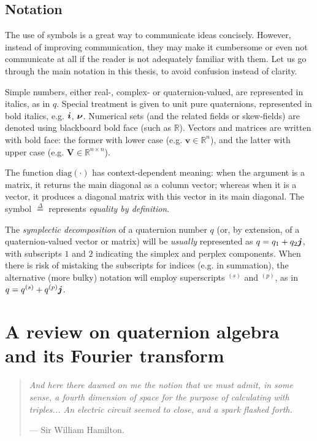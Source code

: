 \section{Notation}
The use of symbols is a great way to communicate ideas concisely. However, instead of improving communication, they may make it cumbersome or even not communicate at all if the reader is not adequately familiar with them. Let us go through the main notation in this thesis, to avoid confusion instead of clarity.

Simple numbers, either real-, complex- or quaternion-valued, are represented in italics, as in $q$. Special treatment is given to unit pure quaternions, represented in bold italics, e.g. $\boldsymbol{i}$, $\boldsymbol{\nu}$. Numerical sets (and the related fields or skew-fields) are denoted using blackboard bold face (such as $\mathbb{R}$). Vectors and matrices are written with bold face: the former with lower case (e.g. $\mathbf{v} \in \mathbb{R}^{n}$), and the latter with upper case (e.g. $\mathbf{V} \in \mathbb{R}^{n \times n}$).

The function $\mathrm{diag}(\cdot)$ has context-dependent meaning: when the argument is a matrix, it returns the main diagonal as a column vector; whereas when it is a vector, it produces a diagonal matrix with this vector in its main diagonal. The symbol $\overset{\Delta}{=}$ represents \textit{equality by definition}.

The \textit{symplectic decomposition} of a quaternion number $q$ (or, by extension, of a quaternion-valued vector or matrix) will be \textit{usually} represented as $q = q_1 + q_2 \boldsymbol{j}$, with subscripts $1$ and $2$ indicating the simplex and perplex components. When there is risk of mistaking the subscripts for indices (e.g. in summation), the alternative (more bulky) notation will employ superscripts $^{(s)}$ and $^{(p)}$, as in $q = q^{(s)} + q^{(p)} \boldsymbol{j}$.


\chapter{A review on quaternion algebra and its Fourier transform}
\label{ch:reviewQuat}

\begin{quotation}
\itshape
And here there dawned on me the notion that we must admit, in some sense, a fourth dimension of space for the purpose of calculating with triples... An electric circuit seemed to close, and a spark flashed forth.

\noindent --- Sir William Hamilton.
\end{quotation}


